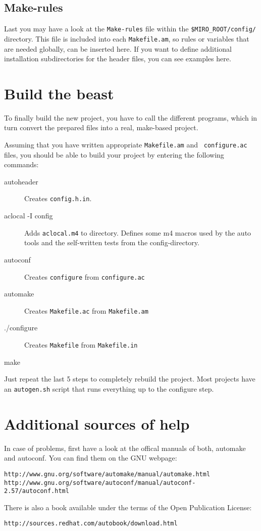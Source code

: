 \subsection{Make-rules}
Last you may have a look at the \texttt{Make-rules} file within the
\texttt{\$MIRO\_ROOT/\-config/} directory. This file is included into each
\texttt{Makefile.am}, so rules or variables that are needed globally,
can be inserted here. If you want to define additional installation
subdirectories for the header files, you can see examples here.

\section{Build the beast}

To finally build the new project, you have to call the different
programs, which in turn convert the prepared files into a real,
make-based project.

Assuming that you have written appropriate {\tt Makefile.am} and {\tt
configure.ac} files, you should be able to build your project by
entering the following commands:

\begin{description}
\item[autoheader] Creates \texttt{config.h.in}.
\item[aclocal -I config] Adds \texttt{aclocal.m4} to directory.
  Defines some m4 macros used by the auto tools and the self-written
  tests from the config-directory.

\item[autoconf] Creates \texttt{configure} from \texttt{configure.ac}
\item[automake] Creates \texttt{Makefile.ac} from \texttt{Makefile.am} 
\item[./\-configure] Creates \texttt{Makefile} from \texttt{Makefile.in}
\item[make]
\end{description}

Just repeat the last 5 steps to completely rebuild the project. Most
projects have an \texttt{autogen.sh} script that runs everything up to
the configure step.


\section{Additional sources of help}

In case of problems, first have a look at the offical manuals of both,
automake and autoconf. You can find them on the GNU webpage:

\begin{verbatim}
http://www.gnu.org/software/automake/manual/automake.html
http://www.gnu.org/software/autoconf/manual/autoconf-2.57/autoconf.html
\end{verbatim}

There is also a book available under the terms of the Open Publication
License:

\begin{verbatim}
http://sources.redhat.com/autobook/download.html
\end{verbatim}

